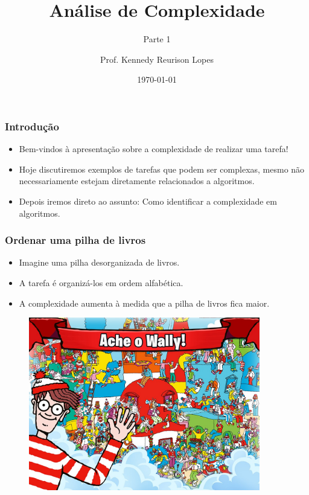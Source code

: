 \documentclass[10pt]{beamer}
\title{Análise de Complexidade}
\subtitle{Parte 1}
\author{Prof. Kennedy Reurison Lopes}
\date{\today}
\begin{document}
\frame{\titlepage}

\begin{frame}
    \frametitle{Introdução}

    \begin{itemize}
        \item Bem-vindos à apresentação sobre a complexidade de realizar uma tarefa!
        \item Hoje discutiremos exemplos de tarefas que podem ser complexas, mesmo não necessariamente estejam diretamente relacionados a algoritmos.
        \item Depois iremos direto ao assunto: Como identificar a complexidade em algoritmos.
    \end{itemize}
\end{frame}

\begin{frame}
    \frametitle{Ordenar uma pilha de livros}
    \begin{itemize}
        \item Imagine uma pilha desorganizada de livros.
        \item A tarefa é organizá-los em ordem alfabética.
        \item A complexidade aumenta à medida que a pilha de livros fica maior.
    \end{itemize}
\end{frame}

\begin{frame}
    \begin{figure}[htb]
        \centering
        \includegraphics[width=0.9\textwidth]{wally.jpg}
        \label{fig:wally2}
    \end{figure}
\end{frame}
\end{document}
